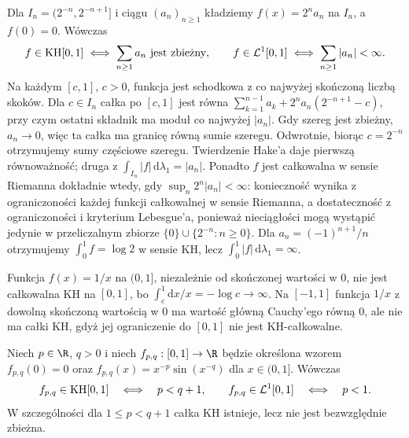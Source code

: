 \begin{przyklad}
Dla $I_n=(2^{-n},2^{-n+1}]$ i ciągu $(a_n)_{n\ge1}$ kładziemy $f(x)=2^n a_n$ na $I_n$, a $f(0)=0$. Wówczas
\[
f\in\HK[0,1]\iff\sum_{n\ge1}a_n\ \text{jest zbieżny},\qquad
f\in\mathcal L^1[0,1]\iff\sum_{n\ge1}|a_n|<\infty.
\]
Na każdym $[c,1]$, $c>0$, funkcja jest schodkowa z co najwyżej skończoną liczbą skoków. Dla $c\in I_n$ całka po $[c,1]$ jest równa $\sum_{k=1}^{n-1}a_k+2^na_n(2^{-n+1}-c)$, przy czym ostatni składnik ma moduł co najwyżej $|a_n|$. Gdy szereg jest zbieżny, $a_n\to0$, więc ta całka ma granicę równą sumie szeregu. Odwrotnie, biorąc $c=2^{-n}$ otrzymujemy sumy częściowe szeregu. Twierdzenie Hake'a daje pierwszą równoważność; druga z $\int_{I_n}|f|\,\mathrm d\lambda_1=|a_n|$. Ponadto $f$ jest całkowalna w sensie Riemanna dokładnie wtedy, gdy $\sup_n2^n|a_n|<\infty$: konieczność wynika z ograniczoności każdej funkcji całkowalnej w sensie Riemanna, a dostateczność z ograniczoności i kryterium Lebesgue'a, ponieważ nieciągłości mogą wystąpić jedynie w przeliczalnym zbiorze $\{0\}\cup\{2^{-n}:n\ge0\}$. Dla $a_n=(-1)^{n+1}/n$ otrzymujemy $\int_0^1f=\log2$ w sensie KH, lecz $\int_0^1|f|\,\mathrm d\lambda_1=\infty$.
\end{przyklad}
\begin{przyklad}
Funkcja $f(x)=1/x$ na $(0,1]$, niezależnie od skończonej wartości w $0$, nie jest całkowalna KH na $[0,1]$, bo $\int_c^1\mathrm dx/x=-\log c\to\infty$. Na $[-1,1]$ funkcja $1/x$ z dowolną skończoną wartością w $0$ ma wartość główną Cauchy'ego równą $0$, ale nie ma całki KH, gdyż jej ograniczenie do $[0,1]$ nie jest KH-całkowalne.
\end{przyklad}
\begin{twierdzenie}\label{ma1:kh:tw:hk-oscylacyjne}\label{tw:hk-oscylacyjne}
Niech $p\in\R$, $q>0$ i niech $f_{p,q}:[0,1]\to\R$ będzie określona wzorem $f_{p,q}(0)=0$ oraz $f_{p,q}(x)=x^{-p}\sin(x^{-q})$ dla $x\in(0,1]$. Wówczas
\[
 f_{p,q}\in\mathrm{KH}[0,1]\quad\Longleftrightarrow\quad p<q+1,
 \qquad f_{p,q}\in\mathcal L^1[0,1]\quad\Longleftrightarrow\quad p<1.
\]
W szczególności dla $1\le p<q+1$ całka KH istnieje, lecz nie jest bezwzględnie zbieżna.
\end{twierdzenie}
